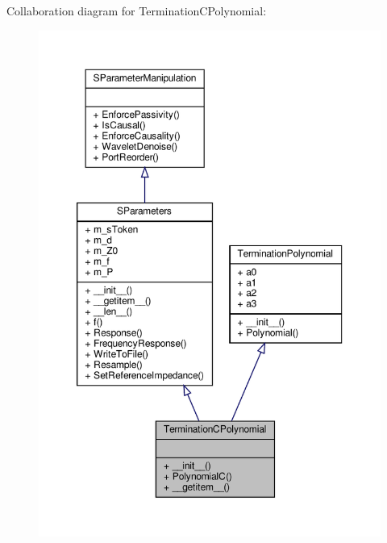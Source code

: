 Collaboration diagram for Termination\+C\+Polynomial\+:\nopagebreak
\begin{figure}[H]
\begin{center}
\leavevmode
\includegraphics[width=350pt]{classSignalIntegrity_1_1Measurement_1_1CalKit_1_1Standards_1_1TerminationPolynomial_1_1TerminationCPolynomial__coll__graph}
\end{center}
\end{figure}
